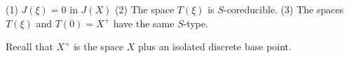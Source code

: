 (1) $J(\xi) = 0$ in $J(X)$
(2) The space $T(\xi)$ is $S$-coreducible.
(3) The spaces $T(\xi)$ and $T(0) = X^+$ have the same $S$-type.

Recall that $X^+$ is the space $X$ plus an isolated discrete base point.
